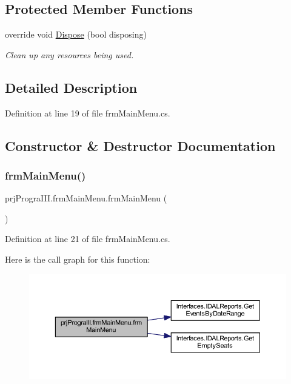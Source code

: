 \subsection*{Protected Member Functions}
\begin{DoxyCompactItemize}
\item 
override void \hyperlink{classprj_progra_i_i_i_1_1frm_main_menu_a912500ba32f7af8f2f097061ebad8b75}{Dispose} (bool disposing)
\begin{DoxyCompactList}\small\item\em Clean up any resources being used. \end{DoxyCompactList}\end{DoxyCompactItemize}


\subsection{Detailed Description}


Definition at line 19 of file frm\+Main\+Menu.\+cs.



\subsection{Constructor \& Destructor Documentation}
\hypertarget{classprj_progra_i_i_i_1_1frm_main_menu_a15c06a0d87b65240b58db4d78c6b54cb}{}\label{classprj_progra_i_i_i_1_1frm_main_menu_a15c06a0d87b65240b58db4d78c6b54cb} 
\subsubsection{\texorpdfstring{frm\+Main\+Menu()}{frmMainMenu()}}
{\footnotesize\ttfamily prj\+Progra\+I\+I\+I.\+frm\+Main\+Menu.\+frm\+Main\+Menu (\begin{DoxyParamCaption}{ }\end{DoxyParamCaption})}



Definition at line 21 of file frm\+Main\+Menu.\+cs.

Here is the call graph for this function\+:
\nopagebreak
\begin{figure}[H]
\begin{center}
\leavevmode
\includegraphics[width=350pt]{classprj_progra_i_i_i_1_1frm_main_menu_a15c06a0d87b65240b58db4d78c6b54cb_cgraph}
\end{center}
\end{figure}


